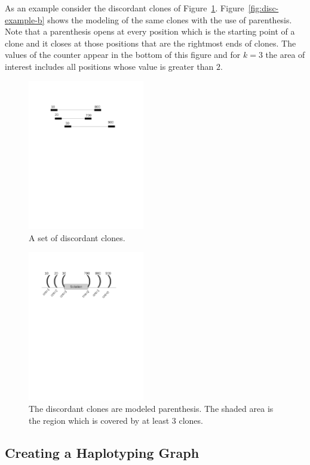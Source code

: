 \documentclass[10pt,fullpage]{article}
\newcommand{\fref}[1]{\mbox{Figure~\ref{#1}}}
\begin{document}
As an example consider the discordant clones of
\fref{fig:disc-example-a}. \fref{fig:disc-example-b} shows the modeling
of the same clones with the use of parenthesis. Note that a
parenthesis opens at every position which is the starting point of a
clone and it closes at those positions that are the rightmost ends of
clones. The values of the counter appear in the bottom of this figure
and for $k=3$ the area of interest includes all positions whose value
is greater than $2$.

\begin{figure}[hbt]
  \centering
  \includegraphics[trim = 30mm 190mm 55mm 40mm,
  clip,width=2in]{fig/disc_example_a.pdf}
  \caption{{\footnotesize A set of discordant clones.}}
  \label{fig:disc-example-a}
\end{figure}

\begin{figure}[hbt]
  \centering
  \includegraphics[trim = 25mm 190mm 55mm 30mm,
  clip,width=2in]{fig/disc_example_b.pdf}
  \caption{{\footnotesize The discordant clones are modeled
  parenthesis. The shaded area is the region which is covered by at
  least $3$ clones.}}
  \label{fig:coverage-example}
\end{figure}

\subsection{Creating a Haplotyping Graph}
\label{sec:haplograph}
\end{document}
